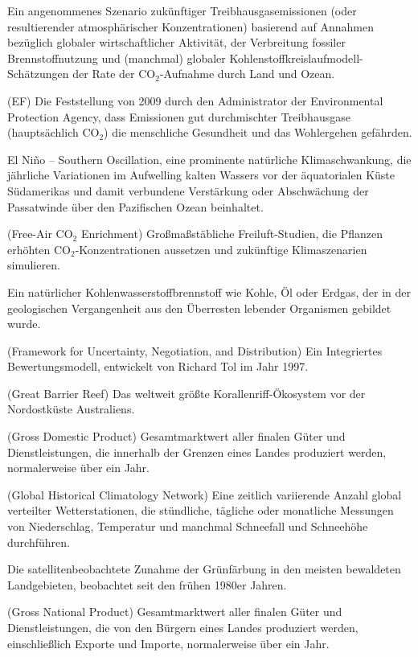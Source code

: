 \documentclass[12pt,paper=a4,DIV=12,parskip=never,chapterprefix=false,headings=standardclasses]{scrreprt}
\begin{document}
\begin{glossar}
\item[EMISSIONSSZENARIO] Ein angenommenes Szenario zukünftiger Treibhausgasemissionen (oder resultierender atmosphärischer Konzentrationen) basierend auf Annahmen bezüglich globaler wirtschaftlicher Aktivität, der Verbreitung fossiler Brennstoffnutzung und (manchmal) globaler Kohlenstoffkreislaufmodell-Schätzungen der Rate der CO$_2$-Aufnahme durch Land und Ozean.
\item[ENDANGERMENT FINDING] (EF) Die Feststellung von 2009 durch den Administrator der Environmental Protection Agency, dass Emissionen gut durchmischter Treibhausgase (hauptsächlich CO$_2$) die menschliche Gesundheit und das Wohlergehen gefährden.
\item[ENSO] El Niño – Southern Oscillation, eine prominente natürliche Klimaschwankung, die jährliche Variationen im Aufwelling kalten Wassers vor der äquatorialen Küste Südamerikas und damit verbundene Verstärkung oder Abschwächung der Passatwinde über den Pazifischen Ozean beinhaltet.
\item[FACE] (Free-Air CO$_2$ Enrichment) Großmaßstäbliche Freiluft-Studien, die Pflanzen erhöhten CO$_2$-Konzentrationen aussetzen und zukünftige Klimaszenarien simulieren.
\item[FOSSILER BRENNSTOFF] Ein natürlicher Kohlenwasserstoffbrennstoff wie Kohle, Öl oder Erdgas, der in der geologischen Vergangenheit aus den Überresten lebender Organismen gebildet wurde.
\item[FUND] (Framework for Uncertainty, Negotiation, and Distribution) Ein Integriertes Bewertungsmodell, entwickelt von Richard Tol im Jahr 1997.
\item[GBR] (Great Barrier Reef) Das weltweit größte Korallenriff-Ökosystem vor der Nordostküste Australiens.
\item[GDP] (Gross Domestic Product) Gesamtmarktwert aller finalen Güter und Dienstleistungen, die innerhalb der Grenzen eines Landes produziert werden, normalerweise über ein Jahr.
\item[GHCN] (Global Historical Climatology Network) Eine zeitlich variierende Anzahl global verteilter Wetterstationen, die stündliche, tägliche oder monatliche Messungen von Niederschlag, Temperatur und manchmal Schneefall und Schneehöhe durchführen.
\item[GLOBALE ERGRÜNUNG] Die satellitenbeobachtete Zunahme der Grünfärbung in den meisten bewaldeten Landgebieten, beobachtet seit den frühen 1980er Jahren.
\item[GNP] (Gross National Product) Gesamtmarktwert aller finalen Güter und Dienstleistungen, die von den Bürgern eines Landes produziert werden, einschließlich Exporte und Importe, normalerweise über ein Jahr.

\end{glossar}
\end{document}
